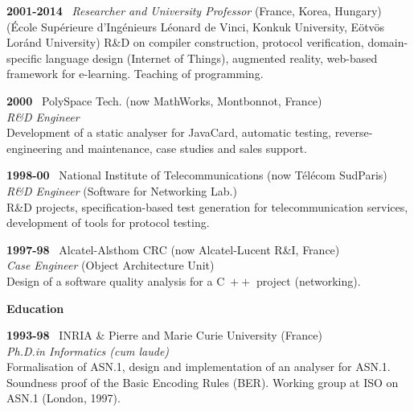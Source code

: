 \documentclass[a4paper,11pt]{article}
\newcommand{\cpp}{\mbox{C \hspace*{-2.5mm} \raise 0.7mm \hbox{${\scriptscriptstyle ++}$}}}
\begin{document}
\bigskip

\noindent\textbf{2001-2014} \ \textsf{\emph{Researcher and University
    Professor}} (France, Korea, Hungary)\\ (\textsf{\'Ecole
  Sup\'erieure d'Ing\'enieurs L\'eonard de Vinci}, \textsf{Konkuk
  University}, \textsf{E\"otv\"os Lor\'and University}) R\&D on
compiler construction, protocol verification, domain\hyp{}specific language
design (Internet of Things), augmented reality, web-based framework
for e-learning. Teaching of programming.

\bigskip

\noindent\textbf{2000} \ \textsf{PolySpace Tech.\@} (now MathWorks,
Montbonnot, France)\\ \emph{R\&D Engineer}\\ Development of a static
analyser for JavaCard, automatic testing, reverse\hyp{}engineering and
maintenance, case studies and sales support.

\bigskip

\noindent\textbf{1998-00} \ \textsf{National Institute of
  Telecommunications} (now T\'el\'ecom SudParis)\\ \emph{R\&D
  Engineer} (Software for Networking Lab.)\\ R\&D projects,
specification-based test generation for telecommunication services,
development of tools for protocol testing.

\bigskip

\noindent\textbf{1997-98} \ \textsf{Alcatel-Alsthom CRC} (now
Alcatel-Lucent R\&I, France)\\ \emph{Case Engineer} (Object
Architecture Unit)\\ Design of a software quality analysis for a
\cpp{} project (networking).

\bigskip
\noindent\textbf{\large Education}
\bigskip

\noindent\textbf{1993-98} \ \textsf{INRIA \& Pierre and Marie Curie
  University} (France)\\ \emph{Ph.D.\@ in Informatics (cum
  laude)}\\ Formalisation of ASN.1, design and implementation of an
analyser for ASN.1. Soundness proof of the Basic Encoding
Rules (BER). Working group at ISO on ASN.1 (London, 1997).
\end{document}
